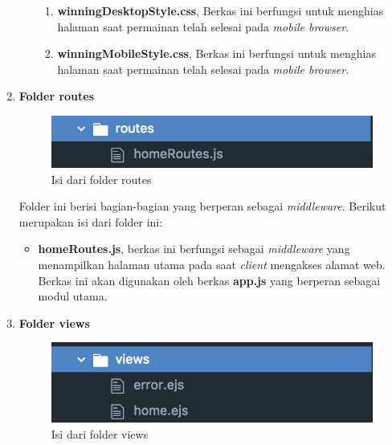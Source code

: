 \begin{enumerate}
\begin{enumerate}
\begin{enumerate}
			\item \textbf{winningDesktopStyle.css}, Berkas ini berfungsi untuk menghias halaman saat permainan telah selesai pada \textit{mobile browser}.
			
			\item \textbf{winningMobileStyle.css}, Berkas ini berfungsi untuk menghias halaman saat permainan telah selesai pada \textit{mobile browser}.
			
			
		\end{enumerate}
	\end{enumerate}
	
	\item \textbf{Folder routes} \\
	
	\begin{figure}[H]
		\centering
		\includegraphics[scale=0.4]{Gambar/direktori_routes}
		\caption{Isi dari folder routes}
		\label{fig:direktori_routes}
	\end{figure}
	
	Folder ini berisi bagian-bagian yang berperan sebagai \textit{middleware}. Berikut merupakan isi dari folder ini:
	\begin{itemize}
		\item \textbf{homeRoutes.js}, berkas ini berfungsi sebagai \textit{middleware} yang menampilkan halaman utama pada saat \textit{client} mengakses alamat web. Berkas ini akan digunakan oleh berkas \textbf{app.js} yang berperan sebagai modul utama.
	\end{itemize}

	\item \textbf{Folder views} \\
	
	\begin{figure}[H]
		\centering
		\includegraphics[scale=0.4]{Gambar/direktori_views}
		\caption{Isi dari folder views}
		\label{fig:direktori_views}
	\end{figure}
	

\end{enumerate}
